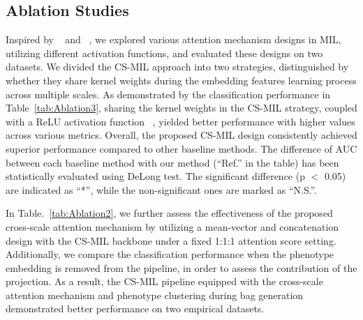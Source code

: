 \documentclass[times,twocolumn,final]{elsarticle}
\begin{document}
\subsection{Ablation Studies}
Inspired by ~\citep{yao2020whole} and ~\citep{ilse2018attention}, we explored various attention mechanism designs in MIL, utilizing different activation functions, and evaluated these designs on two datasets. We divided the CS-MIL approach into two strategies, distinguished by whether they share kernel weights during the embedding features learning process across multiple scales. As demonstrated by the classification performance in Table~\ref{tab:Ablation3}, sharing the kernel weights in the CS-MIL strategy, coupled with a ReLU activation function ~\citep{agarap2018deep}, yielded better performance with higher values across various metrics. Overall, the proposed CS-MIL design consistently achieved superior performance compared to other baseline methods. The difference of AUC between each baseline method with our method (``Ref.” in the table) has been statistically evaluated using DeLong test. The significant difference (p $<$ 0.05) are indicated as ``*”, while the non-significant ones are marked as ``N.S.”.

In Table.~\ref{tab:Ablation2}, we further assess the effectiveness of the proposed cross-scale attention mechanism by utilizing a mean-vector and concatenation design with the CS-MIL backbone under a fixed 1:1:1 attention score setting. Additionally, we compare the classification performance when the phenotype embedding is removed from the pipeline, in order to assess the contribution of the projection. As a result, the CS-MIL pipeline equipped with the cross-scale attention mechanism and phenotype clustering during bag generation demonstrated better performance on two empirical datasets.
\end{document}
